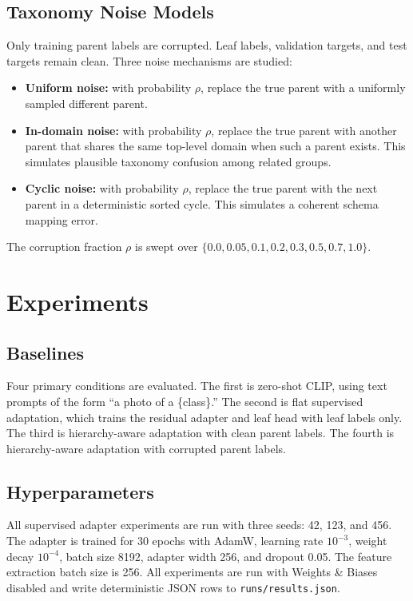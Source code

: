 \documentclass[conference]{IEEEtran}
\begin{document}
\subsection{Taxonomy Noise Models}
Only training parent labels are corrupted. Leaf labels, validation targets, and
test targets remain clean. Three noise mechanisms are studied:
\begin{itemize}
\item \textbf{Uniform noise:} with probability $\rho$, replace the true parent
with a uniformly sampled different parent.
\item \textbf{In-domain noise:} with probability $\rho$, replace the true
parent with another parent that shares the same top-level domain when such a
parent exists. This simulates plausible taxonomy confusion among related
groups.
\item \textbf{Cyclic noise:} with probability $\rho$, replace the true parent
with the next parent in a deterministic sorted cycle. This simulates a coherent
schema mapping error.
\end{itemize}
The corruption fraction $\rho$ is swept over
$\{0.0,0.05,0.1,0.2,0.3,0.5,0.7,1.0\}$.

\section{Experiments}
\subsection{Baselines}
Four primary conditions are evaluated. The first is zero-shot CLIP, using text
prompts of the form ``a photo of a \{class\}.'' The second is flat supervised
adaptation, which trains the residual adapter and leaf head with leaf labels
only. The third is hierarchy-aware adaptation with clean parent labels. The
fourth is hierarchy-aware adaptation with corrupted parent labels.

\subsection{Hyperparameters}
All supervised adapter experiments are run with three seeds: 42, 123, and 456.
The adapter is trained for 30 epochs with AdamW, learning rate $10^{-3}$,
weight decay $10^{-4}$, batch size 8192, adapter width 256, and dropout 0.05.
The feature extraction batch size is 256. All experiments are run with
Weights \& Biases disabled and write deterministic JSON rows to
\texttt{runs/results.json}.
\end{document}
